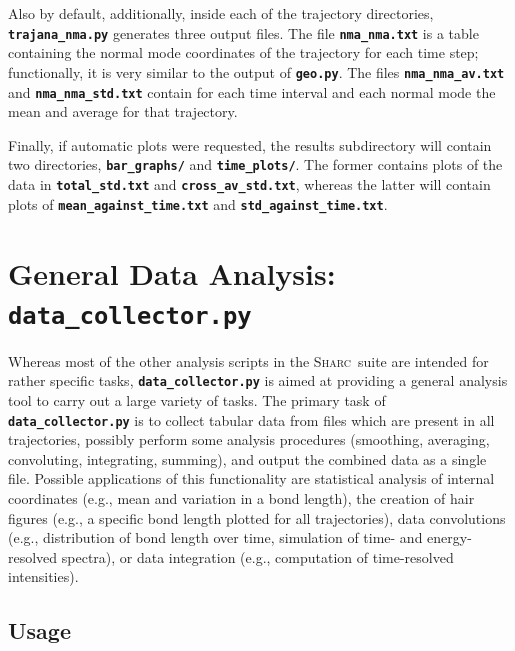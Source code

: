 \documentclass[a4paper,10pt,DIV=15,openany]{scrbook}
\newcommand{\sharc}{\textsc{Sharc}}
\newcommand{\ttt}[1]{\textbf{\texttt{#1}}}
\begin{document}
Also by default, additionally, inside each of the trajectory directories, \ttt{trajana\_nma.py} generates three output files.
The file \ttt{nma\_nma.txt} is a table containing the normal mode coordinates of the trajectory for each time step; functionally, it is very similar to the output of \ttt{geo.py}.
The files \ttt{nma\_nma\_av.txt} and \ttt{nma\_nma\_std.txt} contain for each time interval and each normal mode the mean and average for that trajectory.

Finally, if automatic plots were requested, the results subdirectory will contain two directories, \ttt{bar\_graphs/} and \ttt{time\_plots/}.
The former contains plots of the data in \ttt{total\_std.txt} and \ttt{cross\_av\_std.txt}, whereas the latter will contain plots of \ttt{mean\_against\_time.txt} and \ttt{std\_against\_time.txt}.








\section{General Data Analysis: \ttt{data\_collector.py}}\label{sec:data_collector.py}

Whereas most of the other analysis scripts in the \sharc\ suite are intended for rather specific tasks, \ttt{data\_collector.py} is aimed at providing a general analysis tool to carry out a large variety of tasks.
The primary task of \ttt{data\_collector.py} is to collect tabular data from files which are present in all trajectories, possibly perform some analysis procedures (smoothing, averaging, convoluting, integrating, summing), and output the combined data as a single file.
Possible applications of this functionality are statistical analysis of internal coordinates (e.g., mean and variation in a bond length), the creation of hair figures (e.g., a specific bond length plotted for all trajectories), data convolutions (e.g., distribution of bond length over time, simulation of time- and energy-resolved spectra), or data integration (e.g., computation of time-resolved intensities).

\subsection{Usage}
\end{document}
